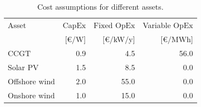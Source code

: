 \begin{table}[h!]
\centering
\caption{Cost assumptions for different assets.}
\label{tab:cost-assumptions}
\begin{tabular}{lrrr}  \toprule
Asset & CapEx & Fixed OpEx & Variable OpEx\\
 & [€/W] & [€/kW/y] & [€/MWh]\\ \midrule
CCGT & 0.9 & 4.5 & 56.0\\
Solar PV & 1.5 & 8.5 & 0.0\\
Offshore wind & 2.0 & 55.0 & 0.0\\
Onshore wind & 1.0 & 15.0 & 0.0\\
 \bottomrule
\end{tabular}
\end{table}
